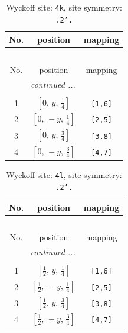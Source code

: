 \documentclass[fleqn,8pt]{jsarticle}
\begin{document}
\renewcommand{\arraystretch}{1.2}
\begin{longtable}{ccc}
\caption{Wyckoff site: {\tt 4k}, site symmetry: {\tt .2'.}}
 \\
 \hline \hline
No. & position & mapping \\ \hline \endfirsthead

\multicolumn{2}{l}{\tablename\ \thetable{}} \\
 \hline \hline
No. & position & mapping \\ \hline \endhead

 \hline \hline
\multicolumn{2}{r}{\footnotesize\it continued ...} \\ \endfoot

 \hline \hline
\multicolumn{2}{r}{} \\ \endlastfoot

1 & $\left[ 0,\, y,\, \frac{1}{4} \right]$ & {\tt [1,6]} \\ \hline
2 & $\left[ 0,\, - y,\, \frac{1}{4} \right]$ & {\tt [2,5]} \\ \hline
3 & $\left[ 0,\, y,\, \frac{3}{4} \right]$ & {\tt [3,8]} \\ \hline
4 & $\left[ 0,\, - y,\, \frac{3}{4} \right]$ & {\tt [4,7]} \\
\end{longtable}
\renewcommand{\arraystretch}{1.2}
\begin{longtable}{ccc}
\caption{Wyckoff site: {\tt 4l}, site symmetry: {\tt .2'.}}
 \\
 \hline \hline
No. & position & mapping \\ \hline \endfirsthead

\multicolumn{2}{l}{\tablename\ \thetable{}} \\
 \hline \hline
No. & position & mapping \\ \hline \endhead

 \hline \hline
\multicolumn{2}{r}{\footnotesize\it continued ...} \\ \endfoot

 \hline \hline
\multicolumn{2}{r}{} \\ \endlastfoot

1 & $\left[ \frac{1}{2},\, y,\, \frac{1}{4} \right]$ & {\tt [1,6]} \\ \hline
2 & $\left[ \frac{1}{2},\, - y,\, \frac{1}{4} \right]$ & {\tt [2,5]} \\ \hline
3 & $\left[ \frac{1}{2},\, y,\, \frac{3}{4} \right]$ & {\tt [3,8]} \\ \hline
4 & $\left[ \frac{1}{2},\, - y,\, \frac{3}{4} \right]$ & {\tt [4,7]} \\
\end{longtable}
\end{document}
